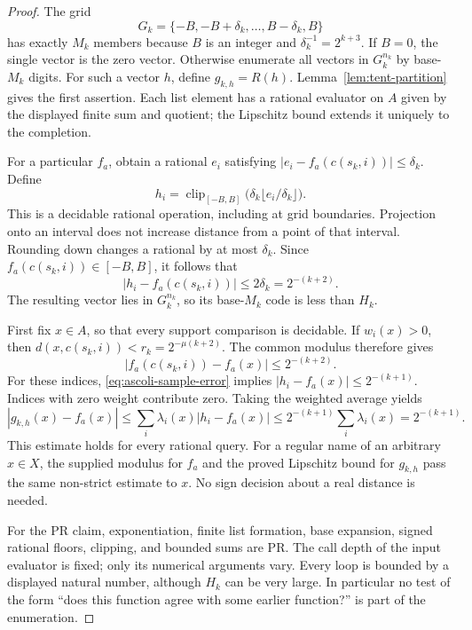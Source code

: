 \begin{proof}
The grid
\[
 G_k=\{-B,-B+\delta_k,\ldots,B-\delta_k,B\}
\]
has exactly $M_k$ members because $B$ is an integer and
$\delta_k^{-1}=2^{k+3}$.  If $B=0$, the single vector is the zero
vector.  Otherwise enumerate all vectors in $G_k^{n_k}$ by
base-$M_k$ digits.  For such a vector $h$, define
$g_{k,h}=R(h)$.  Lemma~\ref{lem:tent-partition} gives the first
assertion.  Each list element has a rational evaluator on $A$ given by
the displayed finite sum and quotient; the Lipschitz bound extends it
uniquely to the completion.

For a particular $f_a$, obtain a rational $e_i$ satisfying
$|e_i-f_a(c(s_k,i))|\le\delta_k$.  Define
\[
 h_i=\operatorname{clip}_{[-B,B]}
       \bigl(\delta_k\lfloor e_i/\delta_k\rfloor\bigr).
\]
This is a decidable rational operation, including at grid boundaries.
Projection onto an interval does not increase distance from a point of
that interval.  Rounding down changes a rational by at most $\delta_k$.
Since $f_a(c(s_k,i))\in[-B,B]$, it follows that
\begin{equation}\label{eq:ascoli-sample-error}
 |h_i-f_a(c(s_k,i))|\le 2\delta_k=2^{-(k+2)}.
\end{equation}
The resulting vector lies in $G_k^{n_k}$, so its base-$M_k$ code is
less than $H_k$.

First fix $x\in A$, so that every support comparison is decidable.
If $w_i(x)>0$, then
$d(x,c(s_k,i))<r_k=2^{-\mu(k+2)}$.  The common modulus therefore gives
\[
 |f_a(c(s_k,i))-f_a(x)|\le 2^{-(k+2)}.
\]
For these indices, \eqref{eq:ascoli-sample-error} implies
$|h_i-f_a(x)|\le 2^{-(k+1)}$.  Indices with zero weight contribute
zero.  Taking the weighted average yields
\[
 |g_{k,h}(x)-f_a(x)|
 \le\sum_i\lambda_i(x)|h_i-f_a(x)|
 \le 2^{-(k+1)}\sum_i\lambda_i(x)=2^{-(k+1)}.
\]
This estimate holds for every rational query.  For a regular name of
an arbitrary $x\in X$, the supplied modulus for $f_a$ and the proved
Lipschitz bound for $g_{k,h}$ pass the same non-strict estimate to $x$.
No sign decision about a real distance is needed.

For the PR claim, exponentiation, finite list formation, base expansion,
signed rational floors, clipping, and bounded sums are PR.  The call
depth of the input evaluator is fixed; only its numerical arguments
vary.  Every loop is bounded by a displayed natural number, although
$H_k$ can be very large.  In particular no test of the form ``does this
function agree with some earlier function?'' is part of the enumeration.
\end{proof}

